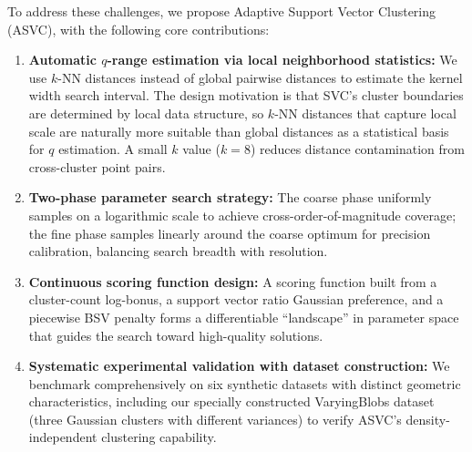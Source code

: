 To address these challenges, we propose Adaptive Support Vector Clustering (ASVC), with the following core contributions:

\begin{enumerate}
\item \textbf{Automatic $q$-range estimation via local neighborhood statistics:} We use $k$-NN distances instead of global pairwise distances to estimate the kernel width search interval. The design motivation is that SVC's cluster boundaries are determined by local data structure, so $k$-NN distances that capture local scale are naturally more suitable than global distances as a statistical basis for $q$ estimation. A small $k$ value ($k=8$) reduces distance contamination from cross-cluster point pairs.

\item \textbf{Two-phase parameter search strategy:} The coarse phase uniformly samples on a logarithmic scale to achieve cross-order-of-magnitude coverage; the fine phase samples linearly around the coarse optimum for precision calibration, balancing search breadth with resolution.

\item \textbf{Continuous scoring function design:} A scoring function built from a cluster-count log-bonus, a support vector ratio Gaussian preference, and a piecewise BSV penalty forms a differentiable ``landscape'' in parameter space that guides the search toward high-quality solutions.

\item \textbf{Systematic experimental validation with dataset construction:} We benchmark comprehensively on six synthetic datasets with distinct geometric characteristics, including our specially constructed VaryingBlobs dataset (three Gaussian clusters with different variances) to verify ASVC's density-independent clustering capability.

\end{enumerate}
